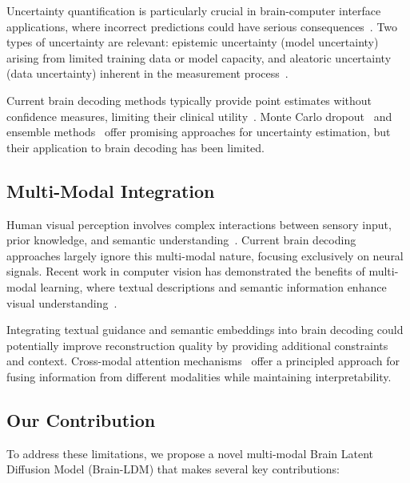 Uncertainty quantification is particularly crucial in brain-computer interface applications, where incorrect predictions could have serious consequences~\cite{wolpaw2002brain}. Two types of uncertainty are relevant: epistemic uncertainty (model uncertainty) arising from limited training data or model capacity, and aleatoric uncertainty (data uncertainty) inherent in the measurement process~\cite{kendall2017uncertainties}.

Current brain decoding methods typically provide point estimates without confidence measures, limiting their clinical utility~\cite{ramsey2006real}. Monte Carlo dropout~\cite{gal2016dropout} and ensemble methods~\cite{lakshminarayanan2017simple} offer promising approaches for uncertainty estimation, but their application to brain decoding has been limited.

\subsection{Multi-Modal Integration}

Human visual perception involves complex interactions between sensory input, prior knowledge, and semantic understanding~\cite{bar2004visual}. Current brain decoding approaches largely ignore this multi-modal nature, focusing exclusively on neural signals. Recent work in computer vision has demonstrated the benefits of multi-modal learning, where textual descriptions and semantic information enhance visual understanding~\cite{radford2021learning}.

Integrating textual guidance and semantic embeddings into brain decoding could potentially improve reconstruction quality by providing additional constraints and context. Cross-modal attention mechanisms~\cite{vaswani2017attention} offer a principled approach for fusing information from different modalities while maintaining interpretability.

\subsection{Our Contribution}

To address these limitations, we propose a novel multi-modal Brain Latent Diffusion Model (Brain-LDM) that makes several key contributions:

